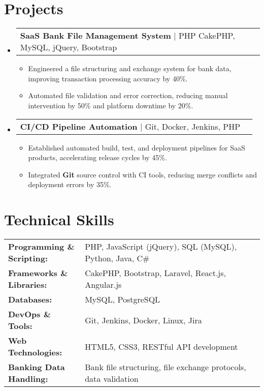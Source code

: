 \documentclass[letterpaper,11pt]{article}
\makeatletter
\newcommand{\resumeItem}[1]{
  \item\footnotesize{
    {#1 \vspace{-2pt}}
  }
}
\newcommand{\resumeProjectHeading}[2]{
    \item
    \begin{tabular*}{1.001\textwidth}{l@{\extracolsep{\fill}}r}
      \small#1 & \textbf{\small #2}\\
    \end{tabular*}\vspace{-7pt}
}
\newcommand{\resumeSubHeadingListStart}{\begin{itemize}[leftmargin=0pt, label={}]}
\newcommand{\resumeSubHeadingListEnd}{\end{itemize}}
\newcommand{\resumeItemListStart}{\begin{itemize}[leftmargin=*]}
\newcommand{\resumeItemListEnd}{\end{itemize}\vspace{-5pt}}
\makeatother
\begin{document}
\section{Projects}
    \vspace{-5pt}
    \resumeSubHeadingListStart
      \resumeProjectHeading
          {\textbf{SaaS Bank File Management System} | PHP CakePHP, MySQL, jQuery, Bootstrap}
          {}
          \resumeItemListStart
              \resumeItem{Engineered a file structuring and exchange system for bank data, improving transaction processing accuracy by 40\%.}
              \resumeItem{Automated file validation and error correction, reducing manual intervention by 50\% and platform downtime by 20\%.}
          \resumeItemListEnd
          \vspace{-16pt}
      \resumeProjectHeading
          {\textbf{CI/CD Pipeline Automation} | Git, Docker, Jenkins, PHP}
          {}
          \resumeItemListStart
              \resumeItem{Established automated build, test, and deployment pipelines for SaaS products, accelerating release cycles by 45\%.}
              \resumeItem{Integrated \textbf{Git} source control with CI tools, reducing merge conflicts and deployment errors by 35\%.}
          \resumeItemListEnd
          \vspace{-16pt}
    \resumeSubHeadingListEnd
\vspace{-10pt}
\section{Technical Skills}
        \vspace{-14pt}
        \begin{table}[h]
            \footnotesize
            \begin{tabular}{p{0.3\linewidth} p{0.7\linewidth}}
                \textbf{Programming \& Scripting:} & PHP, JavaScript (jQuery), SQL (MySQL), Python, Java, C\# \\
                \textbf{Frameworks \& Libraries:} & CakePHP, Bootstrap, Laravel, React.js, Angular.js \\
                \textbf{Databases:} & MySQL, PostgreSQL \\
                \textbf{DevOps \& Tools:} & Git, Jenkins, Docker, Linux, Jira \\
                \textbf{Web Technologies:} & HTML5, CSS3, RESTful API development \\
                \textbf{Banking Data Handling:} & Bank file structuring, file exchange protocols, data validation \\
            \end{tabular}
        \end{table}
\end{document}
